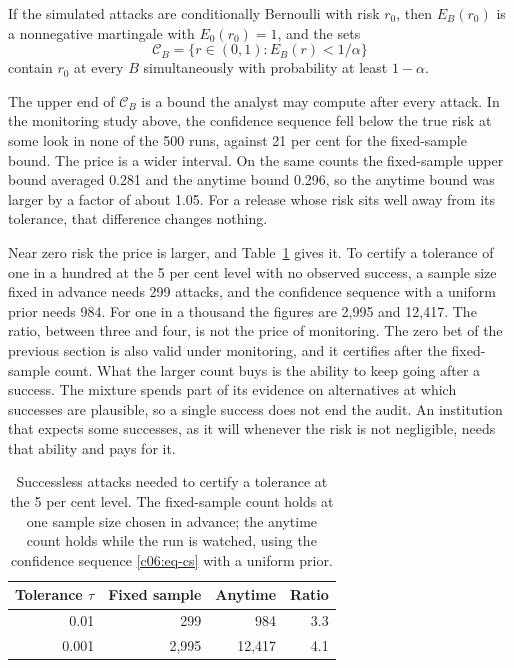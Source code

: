 \begin{proposition}\label{c06:prop-cs}
If the simulated attacks are conditionally Bernoulli with risk $r_0$, then
$E_B(r_0)$ is a nonnegative martingale with $E_0(r_0) = 1$, and the sets
\begin{equation}\label{c06:eq-cs}
\mathcal{C}_B = \{ r \in (0,1) : E_B(r) < 1/\alpha \}
\end{equation}
contain $r_0$ at every $B$ simultaneously with probability at least $1 - \alpha$.
\end{proposition}

The upper end of $\mathcal{C}_B$ is a bound the analyst may compute after every
attack. In the monitoring study above, the confidence sequence fell below the true
risk at some look in none of the 500 runs, against 21 per cent for the fixed-sample
bound.
The price is a wider interval. On the same counts the fixed-sample upper bound
averaged 0.281 and the anytime bound 0.296, so the anytime bound was larger by a
factor of about 1.05.
For a release whose risk sits well away from its tolerance, that difference
changes nothing.

Near zero risk the price is larger, and Table~\ref{c06:tab-anytime} gives it. To
certify a tolerance of one in a hundred at the 5 per cent level with no observed
success, a sample size fixed in advance needs 299 attacks, and the confidence
sequence with a uniform prior needs 984. For one in a thousand the figures are 2,995
and 12,417. The ratio, between three and four, is not the price of monitoring.
The zero bet of the previous section is also valid under monitoring, and it
certifies after the fixed-sample count. What the larger count buys is the ability
to keep going after a success. The mixture spends part of its evidence on
alternatives at which successes are plausible, so a single success does not end the
audit. An institution that expects some successes, as it will whenever the risk is
not negligible, needs that ability and pays for it.

\begin{table}[ht]
\centering
\caption{Successless attacks needed to certify a tolerance at the 5 per cent level.
The fixed-sample count holds at one sample size chosen in advance; the anytime
count holds while the run is watched, using the confidence sequence
\eqref{c06:eq-cs} with a uniform prior.}
\label{c06:tab-anytime}
\begin{tabular}{rrrr}
\toprule
Tolerance $\tau$ & Fixed sample & Anytime & Ratio \\
\midrule
0.01 & 299 & 984 & 3.3 \\
0.001 & 2{,}995 & 12{,}417 & 4.1 \\
\bottomrule
\end{tabular}
\end{table}

